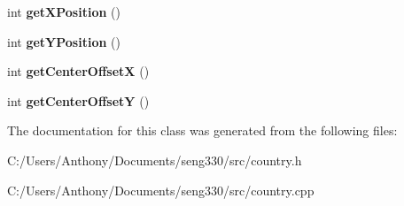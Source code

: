 \begin{DoxyCompactItemize}
\item 
\hypertarget{class_country_ac65b448259ef1d4fc18317b7884a6646}{}int {\bfseries get\+X\+Position} ()\label{class_country_ac65b448259ef1d4fc18317b7884a6646}

\item 
\hypertarget{class_country_a71b28d091bb05451d943743468e79325}{}int {\bfseries get\+Y\+Position} ()\label{class_country_a71b28d091bb05451d943743468e79325}

\item 
\hypertarget{class_country_a0f7e5ff5dbcf7ad7864254f87ae0d241}{}int {\bfseries get\+Center\+Offset\+X} ()\label{class_country_a0f7e5ff5dbcf7ad7864254f87ae0d241}

\item 
\hypertarget{class_country_ac263fa8d4adfc1ee2d8fee8860667d68}{}int {\bfseries get\+Center\+Offset\+Y} ()\label{class_country_ac263fa8d4adfc1ee2d8fee8860667d68}

\end{DoxyCompactItemize}


The documentation for this class was generated from the following files\+:\begin{DoxyCompactItemize}
\item 
C\+:/\+Users/\+Anthony/\+Documents/seng330/src/country.\+h\item 
C\+:/\+Users/\+Anthony/\+Documents/seng330/src/country.\+cpp\end{DoxyCompactItemize}
